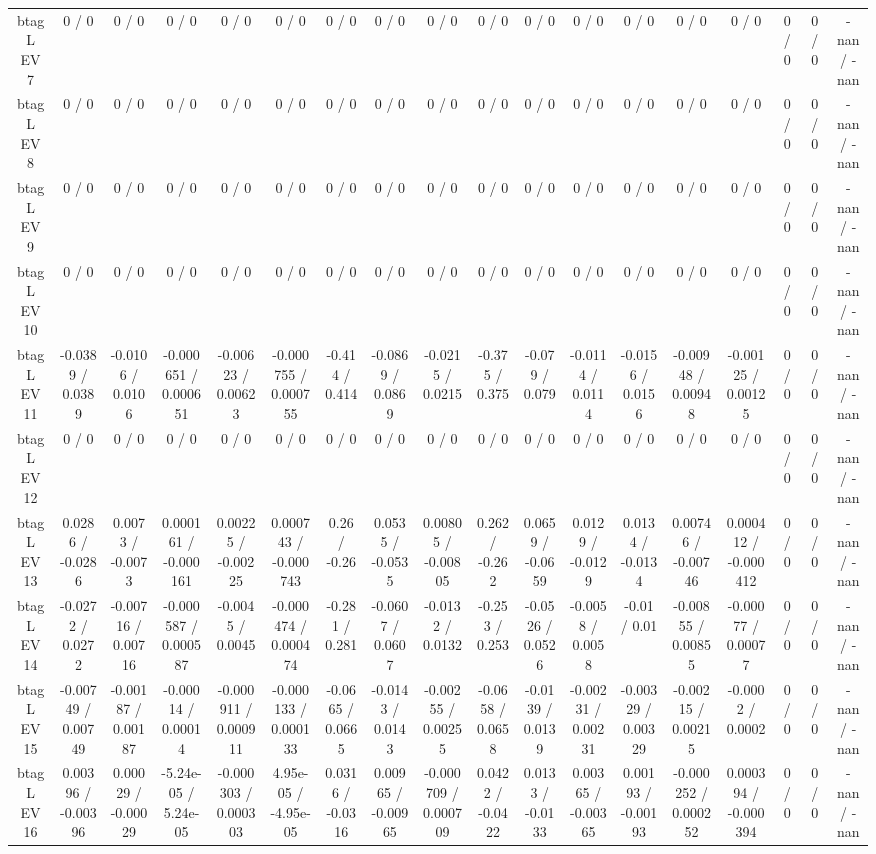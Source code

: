 \documentclass[10pt]{article}
\begin{document}
\begin{table}[htbp]
\begin{center}
\begin{tabular}{|c|c|c|c|c|c|c|c|c|c|c|c|c|c|c|c|c|c|}
  btag L EV 7 & 0 / 0 & 0 / 0 & 0 / 0 & 0 / 0 & 0 / 0 & 0 / 0 & 0 / 0 & 0 / 0 & 0 / 0 & 0 / 0 & 0 / 0 & 0 / 0 & 0 / 0 & 0 / 0 & 0 / 0 & 0 / 0 & -nan / -nan \\ 
  btag L EV 8 & 0 / 0 & 0 / 0 & 0 / 0 & 0 / 0 & 0 / 0 & 0 / 0 & 0 / 0 & 0 / 0 & 0 / 0 & 0 / 0 & 0 / 0 & 0 / 0 & 0 / 0 & 0 / 0 & 0 / 0 & 0 / 0 & -nan / -nan \\ 
  btag L EV 9 & 0 / 0 & 0 / 0 & 0 / 0 & 0 / 0 & 0 / 0 & 0 / 0 & 0 / 0 & 0 / 0 & 0 / 0 & 0 / 0 & 0 / 0 & 0 / 0 & 0 / 0 & 0 / 0 & 0 / 0 & 0 / 0 & -nan / -nan \\ 
  btag L EV 10 & 0 / 0 & 0 / 0 & 0 / 0 & 0 / 0 & 0 / 0 & 0 / 0 & 0 / 0 & 0 / 0 & 0 / 0 & 0 / 0 & 0 / 0 & 0 / 0 & 0 / 0 & 0 / 0 & 0 / 0 & 0 / 0 & -nan / -nan \\ 
  btag L EV 11 & -0.0389 / 0.0389 & -0.0106 / 0.0106 & -0.000651 / 0.000651 & -0.00623 / 0.00623 & -0.000755 / 0.000755 & -0.414 / 0.414 & -0.0869 / 0.0869 & -0.0215 / 0.0215 & -0.375 / 0.375 & -0.079 / 0.079 & -0.0114 / 0.0114 & -0.0156 / 0.0156 & -0.00948 / 0.00948 & -0.00125 / 0.00125 & 0 / 0 & 0 / 0 & -nan / -nan \\ 
  btag L EV 12 & 0 / 0 & 0 / 0 & 0 / 0 & 0 / 0 & 0 / 0 & 0 / 0 & 0 / 0 & 0 / 0 & 0 / 0 & 0 / 0 & 0 / 0 & 0 / 0 & 0 / 0 & 0 / 0 & 0 / 0 & 0 / 0 & -nan / -nan \\ 
  btag L EV 13 & 0.0286 / -0.0286 & 0.0073 / -0.0073 & 0.000161 / -0.000161 & 0.00225 / -0.00225 & 0.000743 / -0.000743 & 0.26 / -0.26 & 0.0535 / -0.0535 & 0.00805 / -0.00805 & 0.262 / -0.262 & 0.0659 / -0.0659 & 0.0129 / -0.0129 & 0.0134 / -0.0134 & 0.00746 / -0.00746 & 0.000412 / -0.000412 & 0 / 0 & 0 / 0 & -nan / -nan \\ 
  btag L EV 14 & -0.0272 / 0.0272 & -0.00716 / 0.00716 & -0.000587 / 0.000587 & -0.0045 / 0.0045 & -0.000474 / 0.000474 & -0.281 / 0.281 & -0.0607 / 0.0607 & -0.0132 / 0.0132 & -0.253 / 0.253 & -0.0526 / 0.0526 & -0.0058 / 0.0058 & -0.01 / 0.01 & -0.00855 / 0.00855 & -0.00077 / 0.00077 & 0 / 0 & 0 / 0 & -nan / -nan \\ 
  btag L EV 15 & -0.00749 / 0.00749 & -0.00187 / 0.00187 & -0.00014 / 0.00014 & -0.000911 / 0.000911 & -0.000133 / 0.000133 & -0.0665 / 0.0665 & -0.0143 / 0.0143 & -0.00255 / 0.00255 & -0.0658 / 0.0658 & -0.0139 / 0.0139 & -0.00231 / 0.00231 & -0.00329 / 0.00329 & -0.00215 / 0.00215 & -0.0002 / 0.0002 & 0 / 0 & 0 / 0 & -nan / -nan \\ 
  btag L EV 16 & 0.00396 / -0.00396 & 0.00029 / -0.00029 & -5.24e-05 / 5.24e-05 & -0.000303 / 0.000303 & 4.95e-05 / -4.95e-05 & 0.0316 / -0.0316 & 0.00965 / -0.00965 & -0.000709 / 0.000709 & 0.0422 / -0.0422 & 0.0133 / -0.0133 & 0.00365 / -0.00365 & 0.00193 / -0.00193 & -0.000252 / 0.000252 & 0.000394 / -0.000394 & 0 / 0 & 0 / 0 & -nan / -nan \\ 

\end{tabular}
\end{center}
\end{table}
\end{document}
